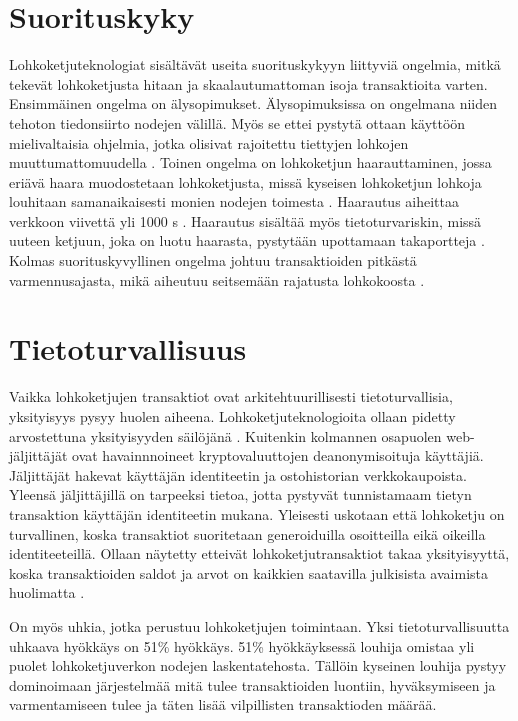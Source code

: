 \documentclass[utf8,bachelor]{gradu3}
\begin{document}
\section{Suorituskyky}
Lohkoketjuteknologiat sisältävät useita suorituskykyyn liittyviä ongelmia, mitkä tekevät lohkoketjusta hitaan ja skaalautumattoman isoja transaktioita varten.
Ensimmäinen ongelma on älysopimukset. Älysopimuksissa on ongelmana niiden tehoton tiedonsiirto nodejen välillä. Myös se ettei pystytä ottaan käyttöön mielivaltaisia ohjelmia, jotka olisivat rajoitettu tiettyjen lohkojen muuttumattomuudella \parencite{yang2019survey}.
Toinen ongelma on lohkoketjun haarauttaminen, jossa eriävä haara muodostetaan lohkoketjusta, missä kyseisen lohkoketjun lohkoja louhitaan samanaikaisesti monien nodejen toimesta \parencite{da2019analysis}. 
Haarautus aiheittaa verkkoon viivettä yli 1000 s \parencite{mivsic2019forks}.
Haarautus sisältää myös tietoturvariskin, missä uuteen ketjuun, joka on luotu haarasta, pystytään upottamaan takaportteja \parencite{wang2019corking}.
Kolmas suorituskyvyllinen ongelma johtuu transaktioiden pitkästä varmennusajasta, mikä aiheutuu seitsemään rajatusta lohkokoosta \parencite{yang2019survey}.


\section{Tietoturvallisuus}
Vaikka lohkoketjujen transaktiot ovat arkitehtuurillisesti tietoturvallisia, yksityisyys pysyy huolen aiheena.
Lohkoketjuteknologioita ollaan pidetty arvostettuna yksityisyyden säilöjänä \parencite{de2016interplay}.
Kuitenkin kolmannen osapuolen web-jäljittäjät ovat havainnnoineet kryptovaluuttojen deanonymisoituja käyttäjiä. Jäljittäjät hakevat käyttäjän identiteetin ja ostohistorian verkkokaupoista. Yleensä jäljittäjillä on tarpeeksi tietoa, jotta pystyvät tunnistamaam tietyn transaktion käyttäjän identiteetin mukana. \parencite{goldfeder2017cookie}
Yleisesti uskotaan että lohkoketju on turvallinen, koska transaktiot suoritetaan generoiduilla osoitteilla eikä oikeilla identiteeteillä.
Ollaan näytetty etteivät lohkoketjutransaktiot takaa yksityisyyttä, koska transaktioiden saldot ja arvot on kaikkien saatavilla julkisista avaimista huolimatta \parencite{kosba2016hawk}.

On myös uhkia, jotka perustuu lohkoketjujen toimintaan. Yksi tietoturvallisuutta uhkaava hyökkäys on 51\% hyökkäys. 51\% hyökkäyksessä louhija omistaa yli puolet lohkoketjuverkon nodejen laskentatehosta. Tällöin kyseinen louhija pystyy dominoimaan järjestelmää mitä tulee transaktioiden luontiin, hyväksymiseen ja varmentamiseen tulee ja täten lisää vilpillisten transaktioden määrää.
\end{document}
